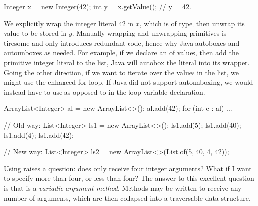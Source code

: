 \begin{verbnobox}[\small]
Integer x = new Integer(42);
int y = x.getValue(); // y = 42.
\end{verbnobox}

We explicitly wrap the integer literal $42$ in $x$, which is of  type, then unwrap its value to be stored in $y$. Manually wrapping and unwrapping primitives is tiresome and only introduces redundant code, hence why Java autoboxes and autounboxes as needed. For example, if we declare an  of  values, then add the primitive integer literal  to the list, Java will autobox the literal into its  wrapper. Going the other direction, if we want to iterate over the values in the list, we might use the enhanced-for loop. If Java did not support autounboxing, we would instead have to use  as opposed to  in the loop variable declaration. 

\begin{verbnobox}[\small]
ArrayList<Integer> al = new ArrayList<>();
al.add(42);
for (int e : al) {
  ...
}
\end{verbnobox}


\begin{verbnobox}[\small]
// Old way:
List<Integer> ls1 = new ArrayList<>();
ls1.add(5);
ls1.add(40);
ls1.add(4);
ls1.add(42);

// New way:
List<Integer> ls2 = new ArrayList<>(List.of(5, 40, 4, 42));
\end{verbnobox}
Using  raises a question: does  only receive four integer arguments? What if I want to specify more than four, or less than four? The answer to this excellent question is that  is a \emph{variadic-argument method}. Methods may be written to receive any number of arguments, which are then collapsed into a traversable data structure.



